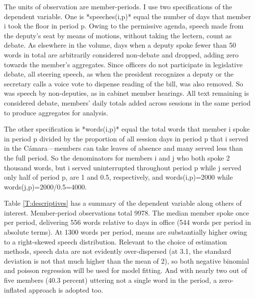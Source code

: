 \documentclass[letter,12pt]{article}
\begin{document}
The units of observation are member-periods. I use two specifications of the dependent variable. One is *speeches(i,p)* equal the number of days that member i took the floor in period p. Owing to the permissive agenda, speech made from the deputy's seat by means of motions, without taking the lectern, count as debate. As elsewhere in the volume, days when a deputy spoke fewer than 50 words in total are arbitrarily considered non-debate and dropped, adding zero towards the member's aggregates. Since officers do not participate in legislative debate, all steering speech, as when the president recognizes a deputy or the secretary calls a voice vote to dispense reading of the bill, was also removed. So was speech by non-deputies, as in cabinet member hearings. All text remaining is considered debate, members' daily totals added across sessions in the same period to produce aggregates for analysis. 

The other specification is *words(i,p)* equal the total words that member i spoke in period p divided by the proportion of all session days in period p that i served in the Cámara---members can take leaves of absence and many served less than the full period. So the denominators for members i and j who both spoke 2 thousand words, but i served uninterrupted throughout period p while j served only half of period p, are 1 and 0.5, respectively, and words(i,p)=2000 while words(j,p)=2000/0.5=4000. 


Table \ref{T:descriptives} has a summary of the dependent variable along others of interest. Member-period observations total 9978. The median member spoke once per period, delivering 556 words relative to days in office (544 words per period in absolute terms). At 1300 words per period, means are substantially higher owing to a right-skewed speech distribution. Relevant to the choice of estimation methods, speech data are not evidently over-dispersed (at 3.1, the standard deviation is not that much higher than the mean of 2), so both negative binomial and poisson regression will be used for model fitting. And with nearly two out of five members (40.3 percent) uttering not a single word in the period, a zero-inflated approach is adopted too.
\end{document}
